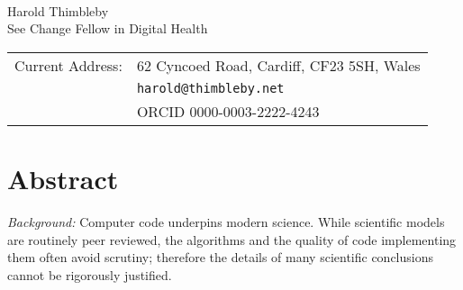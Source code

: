 

\renewcommand\thesubsection{(\thesection.\alph{subsection})}
\usepackage{hyperref}

\def\httpURL#1{\href{http://#1}{\textcolor{blue}{#1}}}
\def\LONGhttpURL#1#2{\href{http://#1}{\textcolor{blue}{#2}}}

\makeatletter
    \def\do@url@hyp{\do/}
    \usepackage{moreverb,url}
\makeatother







\vspace*{0.2in}

\begin{flushleft}
{\Large
\textbf\newline{\mytitle} %
}
\newline
\\
Harold Thimbleby
\\
\bigskip
See Change Fellow in Digital Health
\\
\bigskip


\begin{tabular}{@{}ll}Current Address: &62 Cyncoed Road, Cardiff, CF23 5SH, Wales\\
&\texttt{harold@thimbleby.net}\\
&ORCID 0000-0003-2222-4243
\end{tabular}


\end{flushleft}
\section*{Abstract}
\noindent
\emph{Background:} Computer code underpins modern science. While scientific models are routinely peer reviewed, the algorithms and the quality of code implementing them often avoid scrutiny; therefore the details of many scientific conclusions cannot be rigorously justified. 

